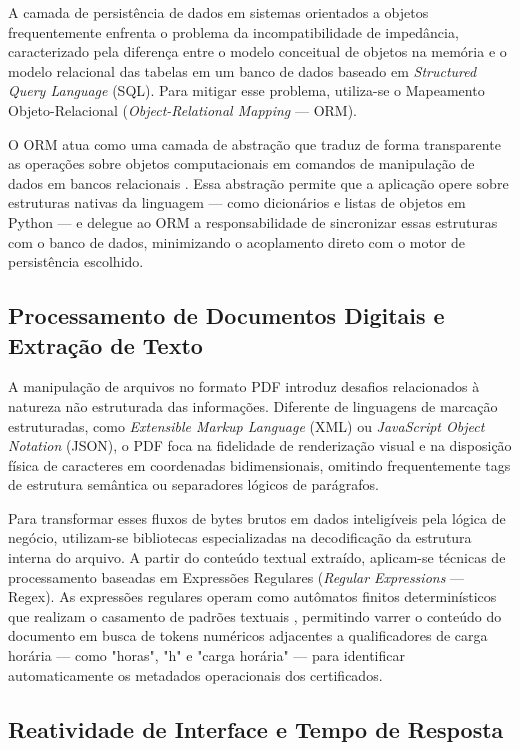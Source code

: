 A camada de persistência de dados em sistemas orientados a objetos frequentemente enfrenta o problema da incompatibilidade de impedância, caracterizado pela diferença entre o modelo conceitual de objetos na memória e o modelo relacional das tabelas em um banco de dados baseado em \textit{Structured Query Language} (SQL). Para mitigar esse problema, utiliza-se o Mapeamento Objeto-Relacional (\textit{Object-Relational Mapping} — ORM).

O ORM atua como uma camada de abstração que traduz de forma transparente as operações sobre objetos computacionais em comandos de manipulação de dados em bancos relacionais \cite{fowler2002}. Essa abstração permite que a aplicação opere sobre estruturas nativas da linguagem — como dicionários e listas de objetos em Python — e delegue ao ORM a responsabilidade de sincronizar essas estruturas com o banco de dados, minimizando o acoplamento direto com o motor de persistência escolhido.


\subsection{Processamento de Documentos Digitais e Extração de Texto}

A manipulação de arquivos no formato PDF introduz desafios relacionados à natureza não estruturada das informações. Diferente de linguagens de marcação estruturadas, como \textit{Extensible Markup Language} (XML) ou \textit{JavaScript Object Notation} (JSON), o PDF foca na fidelidade de renderização visual e na disposição física de caracteres em coordenadas bidimensionais, omitindo frequentemente tags de estrutura semântica ou separadores lógicos de parágrafos.

Para transformar esses fluxos de bytes brutos em dados inteligíveis pela lógica de negócio, utilizam-se bibliotecas especializadas na decodificação da estrutura interna do arquivo. A partir do conteúdo textual extraído, aplicam-se técnicas de processamento baseadas em Expressões Regulares (\textit{Regular Expressions} — Regex). As expressões regulares operam como autômatos finitos determinísticos que realizam o casamento de padrões textuais \cite{hopcroft2006}, permitindo varrer o conteúdo do documento em busca de tokens numéricos adjacentes a qualificadores de carga horária — como "horas", "h" e "carga horária" — para identificar automaticamente os metadados operacionais dos certificados.


\subsection{Reatividade de Interface e Tempo de Resposta}

